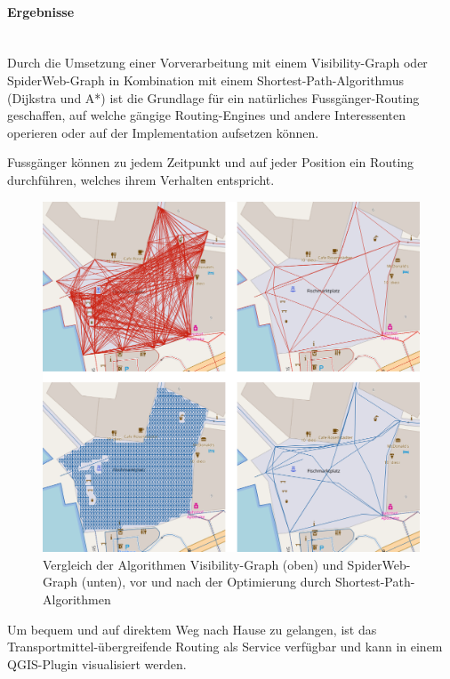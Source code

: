 \paragraph{Ergebnisse}~\\
Durch die Umsetzung einer Vorverarbeitung mit einem Visibility-Graph oder SpiderWeb-Graph in Kombination mit einem Shortest-Path-Algorithmus (Dijkstra und A*) ist die Grundlage für ein natürliches Fussgänger-Routing geschaffen, auf welche gängige Routing-Engines und andere Interessenten operieren oder auf der Implementation aufsetzen können.

Fussgänger können zu jedem Zeitpunkt und auf jeder Position ein Routing durchführen, welches ihrem Verhalten entspricht.

\begin{figure}[ht]
    \centering
    \includegraphics[width=0.8\linewidth]{technicalreport/img/proprecessing_optimization_comparison.png}
    \caption[Vergleich Preprocessing mit und ohne Optimierung]{Vergleich der Algorithmen Visibility-Graph (oben) und SpiderWeb-Graph (unten), vor und nach der Optimierung durch Shortest-Path-Algorithmen}
    \label{fig:proprecessing_optimization_comparison}
\end{figure}

Um bequem und auf direktem Weg nach Hause zu gelangen, ist das Transportmittel-übergreifende Routing als Service verfügbar und kann in einem QGIS-Plugin visualisiert werden.

